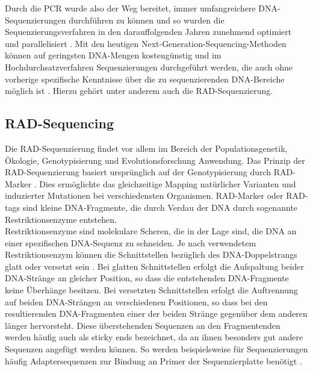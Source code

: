 Durch die PCR wurde also der Weg bereitet, immer umfangreichere DNA-Sequenzierungen durchführen zu können und so wurden die Sequenzierungsverfahren in den darauffolgenden Jahren zunehmend optimiert und parallelisiert \cite{shendure_2008}. Mit den heutigen Next-Generation-Sequencing-Methoden \cite{rizzo_2012, ambardar_2016} können auf geringsten DNA-Mengen kostengünstig und im Hochdurchsatzverfahren Sequenzierungen durchgeführt werden, die auch ohne vorherige spezifische Kenntnisse über die zu sequenzierenden DNA-Bereiche möglich ist \cite{dijk_2014} . Hierzu gehört unter anderem auch die RAD-Sequenzierung.

\subsection{RAD-Sequencing} \label{sec:rad}

Die RAD-Sequenzierung findet vor allem im Bereich der Populationsgenetik, Ökologie, Genotypisierung und Evolutionsforschung Anwendung. Das Prinzip der RAD-Sequenzierung basiert ursprünglich auf der Genotypisierung durch RAD-Marker \cite{miller_2007}. Dies ermöglichte das gleichzeitige Mapping natürlicher Varianten und induzierter Mutationen bei verschiedensten Organismen. RAD-Marker oder RAD-tags sind kleine DNA-Fragmente, die durch Verdau der DNA durch sogenannte Restriktionsenzyme entstehen. \\

Restriktionsenzyme sind molekulare Scheren, die in der Lage sind, die DNA an einer spezifischen DNA-Sequenz zu schneiden. Je nach verwendetem Restriktionsenzym können die Schnittstellen bezüglich des DNA-Doppelstrangs glatt oder versetzt sein \cite{roberts_2003}. Bei glatten Schnittstellen erfolgt die Aufspaltung beider DNA-Stränge an gleicher Position, so dass die entstehenden DNA-Fragmente keine Überhänge besitzen. Bei versetzten Schnittstellen erfolgt die Auftrennung auf beiden DNA-Strängen an verschiedenen Positionen, so dass bei den resultierenden DNA-Fragmenten einer der beiden Stränge gegenüber dem anderen länger hervorsteht. Diese überstehenden Sequenzen an den Fragmentenden werden häufig auch als sticky ends bezeichnet, da an ihnen besonders gut andere Sequenzen angefügt werden können. So werden beispielsweise für Sequenzierungen häufig Adaptersequenzen zur Bindung an Primer der Sequenzierplatte benötigt \cite{mardis_2017}. \\

